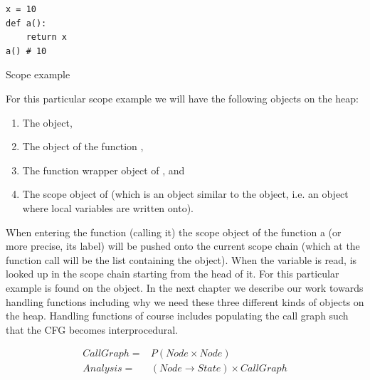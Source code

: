 \begin{listing}[H]
	\begin{verbatim}
x = 10
def a():
	return x
a() # 10
	\end{verbatim}
\caption{Scope example}\label{code:ScopeExample}
\end{listing}

For this particular scope example we will have the following objects on the heap:

\begin{enumerate}
  \item The  object,
  \item The object of the function ,
  \item The function wrapper object of , and
  \item The scope object of  (which is an object similar to the  object, i.e. an object where local variables are written onto).
\end{enumerate}

When entering the function (calling it) the scope object of the function a (or more precise, its label) will be pushed onto the current scope chain (which at the function call will be the list containing the  object). When the variable  is read,  is looked up in the scope chain starting from the head of it. For this particular example  is found on the  object. In the next chapter we describe our work towards handling functions including why we need these three different kinds of objects on the heap. Handling functions of course includes populating the call graph such that the CFG becomes interprocedural.

\begin{eqnarray*}
CallGraph = & P(Node \times Node) \\
Analysis = & (Node \rightarrow State) \times CallGraph
\end{eqnarray*}
